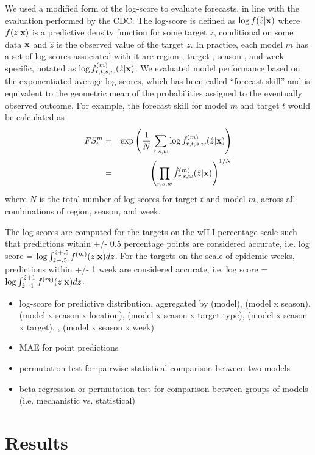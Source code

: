 \documentclass{article}
\begin{document}
We used a modified form of the log-score to evaluate forecasts, in line with the evaluation performed by the CDC. The log-score is defined as $\log f(\hat z|\bf{x})$ where $f(z|\bf{x})$ is a predictive density function for some target $z$, conditional on some data $\bf{x}$ and $\hat z$ is the observed value of the target $z$. In practice, each model $m$ has a set of log scores associated with it are region-, target-, season-, and week- specific, notated as $\log f^{(m)}_{r,t,s,w}(\hat z|\bf{x})$. We evaluated model performance based on the exponentiated average log scores, which has been called ``forecast skill'' and is equivalent to the geometric mean of the probabilities assigned to the eventually observed outcome. 
For example, the forecast skill for model $m$ and target $t$ would be calculated as
\begin{eqnarray}
 FS^{m}_{t} & = & \exp \left ( \frac{1}{N} \sum_{r,s,w} \log \hat f^{(m)}_{r,t,s,w}(\hat z|{\bf x}) \right ) \\
 & = & \left ( \prod_{r,s,w} \hat f^{(m)}_{r,s,w}(\hat z|{\bf x}) \right ) ^{1/N} 
\end{eqnarray}
where $N$ is the total number of log-scores for target $t$ and model $m$, across all combinations of region, season, and week.

The log-scores are computed for the targets on the wILI percentage scale such that predictions within +/- 0.5 percentage points are considered accurate, i.e. log score = $\log \int_{\hat z -.5}^{\hat z + .5} f^{(m)}(z|{\bf{x}})dz$. For the targets on the scale of epidemic weeks, predictions within +/- 1 week are considered accurate, i.e. log score = $\log \int_{\hat z -1}^{\hat z + 1} f^{(m)}(z|{\bf{x}})dz$. 

\begin{itemize}
    \item log-score for predictive distribution, aggregated by (model), (model x season), (model x season x location), (model x season x target-type), (model x season x target), , (model x season x week)
    \item MAE for point predictions
    \item permutation test for pairwise statistical comparison between two models
    \item beta regression or permutation test for comparison between groups of models (i.e. mechanistic vs. statistical)
\end{itemize}


\section{Results}
\end{document}
